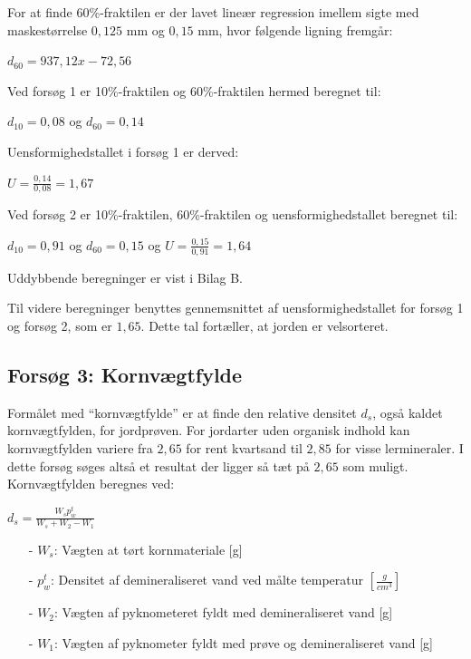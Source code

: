 For at finde 60\%-fraktilen er der lavet lineær regression imellem sigte med maskestørrelse $0,\!125$ mm og $0,\!15$ mm, hvor følgende ligning fremgår:

\begin{center}
	$d_{60}=937,\!12x - 72,\!56$
\end{center}

Ved forsøg 1 er 10\%-fraktilen og 60\%-fraktilen hermed beregnet til: 
\begin{center}
	$d_{10} = 0,\!08$ og $d_{60} = 0,\!14$
\end{center} 

Uensformighedstallet i forsøg 1 er derved:
\begin{center}
	$U = \frac{0,\!14}{0,\!08} = 1,\!67$
\end{center}

Ved forsøg 2 er 10\%-fraktilen, 60\%-fraktilen og uensformighedstallet beregnet til:
\begin{center}
	$d_{10} = 0,\!91$ og $d_{60} = 0,\!15$ og $U = \frac{0,\!15}{0,\!91} = 1,\!64$
\end{center} 
Uddybbende beregninger er vist i Bilag B. 

Til videre beregninger benyttes gennemsnittet af uensformighedstallet for forsøg 1 og forsøg 2, som er $1,\!65$. Dette tal fortæller, at jorden er velsorteret. 

\subsection{Forsøg 3: Kornvægtfylde}
Formålet med “kornvægtfylde” er at finde den relative densitet $d_s$, også kaldet kornvægtfylden, for jordprøven. For jordarter uden organisk indhold kan kornvægtfylden variere fra $2,\!65$ for rent kvartsand til $2,\!85$ for visse lermineraler. I dette forsøg søges altså et resultat der ligger så tæt på $2,\!65$ som muligt.
\newline
\newline
Kornvægtfylden beregnes ved:

\begin{center}
	$d_s = \frac{W_s p_w^t}{W_s + W_2 - W_1}$
\end{center}

\begin{itemize}
	\item[-] $W_s$: Vægten at tørt kornmateriale [g]
	\item[-] $p_w^t$: Densitet af demineraliseret vand ved målte temperatur $[\frac{g}{cm^3}]$
	\item[-] $W_2$: Vægten af pyknometeret fyldt med demineraliseret vand [g]
	\item[-] $W_1$: Vægten af pyknometer fyldt med prøve og demineraliseret vand [g]
\end{itemize}


